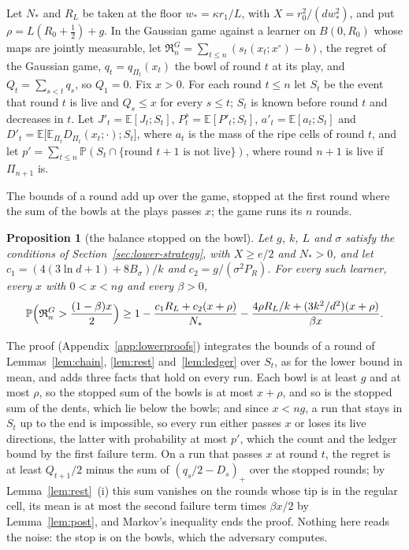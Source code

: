 \documentclass[11pt]{amsart}
\newtheorem{proposition}[theorem]{Proposition}
\theoremstyle{definition}
\numberwithin{equation}{section}
\newcommand{\E}{\mathbb{E}}
\newcommand{\Prob}{\mathbb{P}}
\newcommand{\Reg}{\mathfrak{R}}
\begin{document}
Let $N_*$ and $R_L$ be taken at the floor $w_*=\kappa r_1/L$, with $X=r_0^2/(dw_*^2)$, and put $\rho=L(R_0+\frac12)+g$. In the Gaussian game against a learner on $B(0,R_0)$ whose maps are jointly measurable, let $\Reg^G_n=\sum_{t\le n}(s_t(x_t;x^\circ)-b)$, the regret of the Gaussian game, $q_t=q_{\Pi_t}(x_t)$ the bowl of round $t$ at its play, and $Q_t=\sum_{s<t}q_s$, so $Q_1=0$. Fix $x>0$. For each round $t\le n$ let $S_t$ be the event that round $t$ is live and $Q_s\le x$ for every $s\le t$; $S_t$ is known before round $t$ and decreases in $t$. Let $J'_t=\E[J_t;S_t]$, $P^s_t=\E[P'_t;S_t]$, $a'_t=\E[a_t;S_t]$ and $D'_t=\E\bigl[\E_{\Pi_t}D_{\Pi_t}(x_t;\cdot);S_t\bigr]$, where $a_t$ is the mass of the ripe cells of round $t$, and let $p'=\sum_{t\le n}\Prob(S_t\cap\{\text{round }t+1\text{ is not live}\})$, where round $n+1$ is live if $\Pi_{n+1}$ is.

The bounds of a round add up over the game, stopped at the first round where the sum of the bowls at the plays passes $x$; the game runs its $n$ rounds.

\begin{proposition}[the balance stopped on the bowl]\label{prop:stop}
Let $g$, $k$, $L$ and $\sigma$ satisfy the conditions of Section~\ref{sec:lower-strategy}, with $X\ge e/2$ and $N_*>0$, and let $c_1=(4(3\ln d+1)+8B_\sigma)/k$ and $c_2=g/(\sigma^2P_R)$. For every such learner, every $x$ with $0<x<ng$ and every $\beta>0$,
\[
\Prob\Bigl(\Reg^G_n>\frac{(1-\beta)x}2\Bigr)\ge1-\frac{c_1R_L+c_2(x+\rho)}{N_*}-\frac{4\rho R_L/k+(3k^2/d^2)(x+\rho)}{\beta x}.
\]
\end{proposition}

The proof (Appendix~\ref{app:lowerproofs}) integrates the bounds of a round of Lemmas~\ref{lem:chain}, \ref{lem:rest} and~\ref{lem:ledger} over $S_t$, as for the lower bound in mean, and adds three facts that hold on every run. Each bowl is at least $g$ and at most $\rho$, so the stopped sum of the bowls is at most $x+\rho$, and so is the stopped sum of the dents, which lie below the bowls; and since $x<ng$, a run that stays in $S_t$ up to the end is impossible, so every run either passes $x$ or loses its live directions, the latter with probability at most $p'$, which the count and the ledger bound by the first failure term. On a run that passes $x$ at round $t$, the regret is at least $Q_{t+1}/2$ minus the sum of $(q_s/2-D_s)_+$ over the stopped rounds; by Lemma~\ref{lem:rest}~(i) this sum vanishes on the rounds whose tip is in the regular cell, its mean is at most the second failure term times $\beta x/2$ by Lemma~\ref{lem:post}, and Markov's inequality ends the proof. Nothing here reads the noise: the stop is on the bowls, which the adversary computes.
\end{document}
